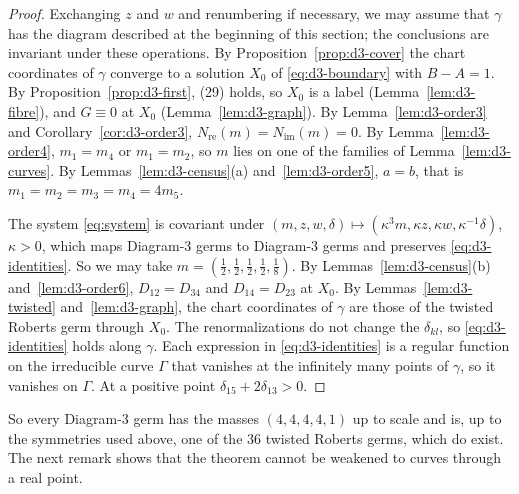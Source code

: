 \begin{proof}
Exchanging $z$ and $w$ and renumbering if necessary, we may assume that $\gamma$ has the diagram
described at the beginning of this section; the conclusions are invariant under these
operations.  By Proposition~\ref{prop:d3-cover} the chart coordinates of $\gamma$ converge to a
solution $X_0$ of \eqref{eq:d3-boundary} with $B-A=1$.  By Proposition~\ref{prop:d3-first},
(29) holds, so $X_0$ is a label (Lemma~\ref{lem:d3-fibre}), and $G\equiv0$ at $X_0$
(Lemma~\ref{lem:d3-graph}).  By Lemma~\ref{lem:d3-order3} and Corollary~\ref{cor:d3-order3},
$N_{\mathrm{re}}(m)=N_{\mathrm{im}}(m)=0$.  By Lemma~\ref{lem:d3-order4}, $m_1=m_4$ or $m_1=m_2$,
so $m$ lies on one of the families of Lemma~\ref{lem:d3-curves}.  By
Lemmas~\ref{lem:d3-census}(a) and~\ref{lem:d3-order5}, $a=b$, that is $m_1=m_2=m_3=m_4=4m_5$.

The system \eqref{eq:system} is covariant under
$(m,z,w,\delta)\mapsto(\kappa^3m,\kappa z,\kappa w,\kappa^{-1}\delta)$, $\kappa>0$, which maps
Diagram-3 germs to Diagram-3 germs and preserves \eqref{eq:d3-identities}.  So we may take
$m=(\frac12,\frac12,\frac12,\frac12,\frac18)$.
By Lemmas~\ref{lem:d3-census}(b) and~\ref{lem:d3-order6}, $D_{12}=D_{34}$ and $D_{14}=D_{23}$ at
$X_0$.  By Lemmas~\ref{lem:d3-twisted} and~\ref{lem:d3-graph}, the chart coordinates of $\gamma$
are those of the twisted Roberts germ through $X_0$.  The renormalizations do not change the
$\delta_{kl}$, so \eqref{eq:d3-identities} holds along $\gamma$.  Each expression in
\eqref{eq:d3-identities} is a regular function on the irreducible curve $\Gamma$ that vanishes at
the infinitely many points of $\gamma$, so it vanishes on $\Gamma$.  At a positive point
$\delta_{15}+2\delta_{13}>0$.
\end{proof}

So every Diagram-3 germ has the masses $(4,4,4,4,1)$ up to scale and is, up to the symmetries
used above, one of the $36$ twisted Roberts germs, which do exist.  The next remark shows that
the theorem cannot be weakened to curves through a real point.


